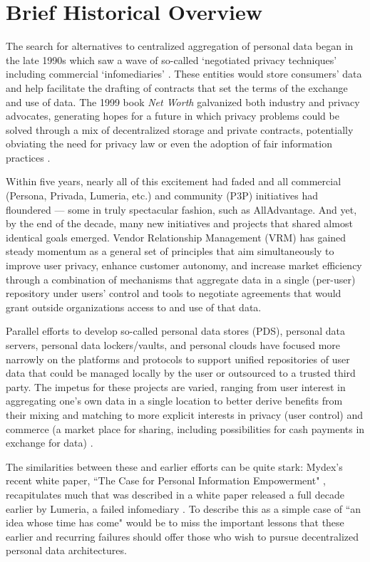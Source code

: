 \documentclass{acm_proc_article-sp}
\begin{document}
\section{Brief Historical Overview}
 

The search for alternatives to centralized aggregation of personal data began in the late 1990s which saw a wave of so-called `negotiated privacy techniques' including commercial `infomediaries' \cite{comingbattle, Dix}. These entities would store consumers' data and help facilitate the drafting of contracts that set the terms of the exchange and use of data.  The 1999 book {\em Net Worth} \cite{networth} galvanized both industry and privacy advocates, generating hopes for a future in which privacy problems could be solved through a mix of decentralized storage and private contracts, potentially obviating the need for privacy law or even the adoption of fair information practices \cite{catlett, dawn}.

Within five years, nearly all of this excitement had faded and all commercial (Persona, Privada, Lumeria, etc.) and community (P3P) initiatives had floundered \cite{ackerman} --- some in truly spectacular fashion, such as AllAdvantage.  And yet, by the end of the decade, many new initiatives and projects that shared almost identical goals emerged.  Vendor Relationship Management (VRM) \cite{Mitchell_Henderson_Searls_2008} has gained steady momentum as a general set of principles that aim simultaneously to improve user privacy, enhance customer autonomy, and increase market efficiency through a combination of mechanisms that aggregate data in a single (per-user) repository under users' control and tools to negotiate agreements that would grant outside organizations access to and use of that data.
 
Parallel efforts to develop so-called personal data stores (PDS), personal data servers, personal data lockers/vaults, and personal clouds \cite{personalcloud} have focused more narrowly on the platforms and protocols to support unified repositories of user data that could be managed locally by the user or outsourced to a trusted third party.  The impetus for these projects are varied, ranging from user interest in aggregating one's own data in a single location to better derive benefits from their mixing and matching to more explicit interests in privacy (user control) and commerce (a market place for sharing, including possibilities for cash payments in exchange for data) \cite{startupcircle}.

The similarities between these and earlier efforts can be quite stark: Mydex's recent white paper, ``The Case for Personal Information Empowerment" \cite{mydex}, recapitulates much that was described in a white paper released a full decade earlier by Lumeria, a failed infomediary \cite{Lumeria}.  To describe this as a simple case of ``an idea whose time has come" would be to miss the important lessons that these earlier and recurring failures should offer those who wish to pursue decentralized personal data architectures.
\end{document}
